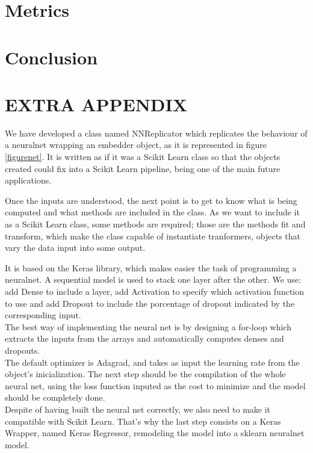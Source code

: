 \documentclass[a4paper,11pt,spanish]{report}
\begin{document}
\chapter{Metrics}
\label{chap:met}



\chapter{Conclusion}
\label{chap:conc}



\chapter{EXTRA APPENDIX}
\label{chap:append}

We have developed a class named NNReplicator which replicates the behaviour of a neuralnet wrapping an embedder object, as it is represented in figure \ref{figurenet}. It is written as if it was a Scikit Learn class so that the objects created could fix into a Scikit Learn pipeline, being one of the main future applications.

Once the inputs are understood, the next point is to get to know what is being computed and what methods are included in the class. As we want to include it as a Scikit Learn class, some methods are required; those are the methods fit and transform, which make the class capable of instantiate tranformers, objects that vary the data input into some output.

It is based on the Keras library, which makes easier the task of programming a neuralnet. A sequential model is used to stack one layer after the other. We use: add Dense to include a layer, add Activation to specify which activation function to use and add Dropout to include the porcentage of dropout indicated by the corresponding input.\\
The best way of implementing the neural net is by designing a for-loop which extracts the inputs from the arrays and automatically computes denses and dropouts.\\
The default optimizer is Adagrad, and takes as input the learning rate from the object's inicialization. The next step should be the compilation of the whole neural net, using the loss function inputed as the cost to minimize and the model should be completely done.\\
Despite of having built the neural net correctly, we also need to make it compatible with Scikit Learn. That's why the last step consists on a Keras Wrapper, named Keras Regressor, remodeling the model into a sklearn neuralnet model.
\end{document}
